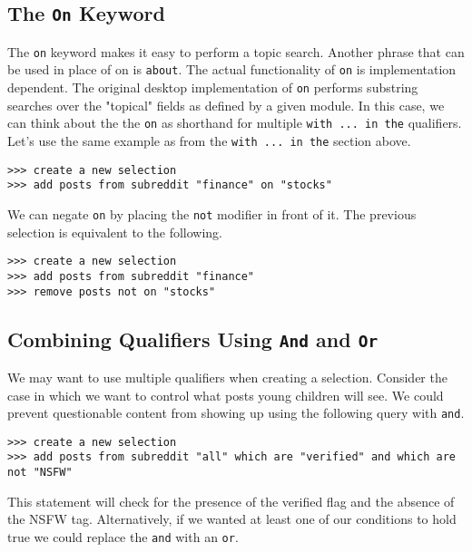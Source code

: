 \subsection{The \texttt{On} Keyword}
The \texttt{on} keyword makes it easy to perform a topic search. Another phrase that can be used in place of on is \texttt{about}. The actual functionality of \texttt{on} is implementation dependent. The original desktop implementation of \texttt{on} performs substring searches over the "topical" fields as defined by a given module. In this case, we can think about the the \texttt{on} as shorthand for multiple \texttt{with ... in the} qualifiers. Let’s use the same example as from the  \texttt{with ... in the} section above.
\begin{lstlisting}
>>> create a new selection
>>> add posts from subreddit "finance" on "stocks"
\end{lstlisting}
We can negate \texttt{on} by placing the \texttt{not} modifier in front of it. The previous selection is equivalent to the following.
\begin{lstlisting}
>>> create a new selection
>>> add posts from subreddit "finance"
>>> remove posts not on "stocks"
\end{lstlisting}
\subsection{Combining Qualifiers Using \texttt{And} and \texttt{Or}}
We may want to use multiple qualifiers when creating a selection. Consider the case in which we want to control what posts young children will see. We could prevent questionable content from showing up using the following query with \texttt{and}.
\begin{lstlisting}
>>> create a new selection
>>> add posts from subreddit "all" which are "verified" and which are not "NSFW"
\end{lstlisting}
This statement will check for the presence of the verified flag and the absence of the NSFW tag. Alternatively, if we wanted at least one of our conditions to hold true we could replace the \texttt{and} with an \texttt{or}.

